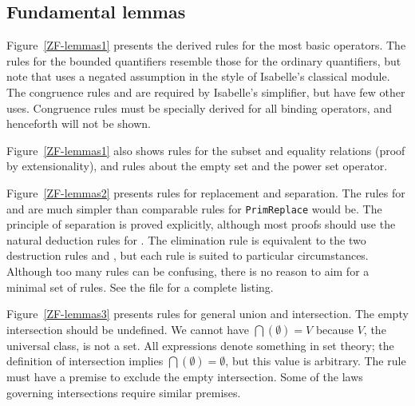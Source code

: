 \subsection{Fundamental lemmas}
Figure~\ref{ZF-lemmas1} presents the derived rules for the most basic
operators.  The rules for the bounded quantifiers resemble those for the
ordinary quantifiers, but note that  uses a negated
assumption in the style of Isabelle's classical module.  The congruence rules
 and  are required by Isabelle's
simplifier, but have few other uses.  Congruence rules must be specially
derived for all binding operators, and henceforth will not be shown.

Figure~\ref{ZF-lemmas1} also shows rules for the subset and equality
relations (proof by extensionality), and rules about the empty set and the
power set operator.

Figure~\ref{ZF-lemmas2} presents rules for replacement and separation.
The rules for  and  are much simpler than
comparable rules for {\tt PrimReplace} would be.  The principle of
separation is proved explicitly, although most proofs should use the
natural deduction rules for .  The elimination rule
 is equivalent to the two destruction rules
 and , but each rule is suited to
particular circumstances.  Although too many rules can be confusing, there
is no reason to aim for a minimal set of rules.  See the file
 for a complete listing.

Figure~\ref{ZF-lemmas3} presents rules for general union and intersection.
The empty intersection should be undefined.  We cannot have
$\bigcap(\emptyset)=V$ because $V$, the universal class, is not a set.  All
expressions denote something in {\ZF} set theory; the definition of
intersection implies $\bigcap(\emptyset)=\emptyset$, but this value is
arbitrary.  The rule  must have a premise to exclude
the empty intersection.  Some of the laws governing intersections require
similar premises.



